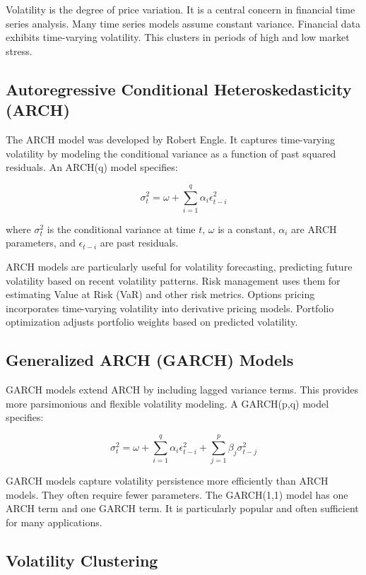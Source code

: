 Volatility is the degree of price variation. It is a central concern in financial time series analysis. Many time series models assume constant variance. Financial data exhibits time-varying volatility. This clusters in periods of high and low market stress.

\subsection{Autoregressive Conditional Heteroskedasticity (ARCH)}

The ARCH model was developed by Robert Engle. It captures time-varying volatility by modeling the conditional variance as a function of past squared residuals. An ARCH(q) model specifies:

\[
\sigma_t^2 = \omega + \sum_{i=1}^{q} \alpha_i \epsilon_{t-i}^2
\]

where \(\sigma_t^2\) is the conditional variance at time \(t\), \(\omega\) is a constant, \(\alpha_i\) are ARCH parameters, and \(\epsilon_{t-i}\) are past residuals.

ARCH models are particularly useful for volatility forecasting, predicting future volatility based on recent volatility patterns. Risk management uses them for estimating Value at Risk (VaR) and other risk metrics. Options pricing incorporates time-varying volatility into derivative pricing models. Portfolio optimization adjusts portfolio weights based on predicted volatility.

\subsection{Generalized ARCH (GARCH) Models}

GARCH models extend ARCH by including lagged variance terms. This provides more parsimonious and flexible volatility modeling. A GARCH(p,q) model specifies:

\[
\sigma_t^2 = \omega + \sum_{i=1}^{q} \alpha_i \epsilon_{t-i}^2 + \sum_{j=1}^{p} \beta_j \sigma_{t-j}^2
\]

GARCH models capture volatility persistence more efficiently than ARCH models. They often require fewer parameters. The GARCH(1,1) model has one ARCH term and one GARCH term. It is particularly popular and often sufficient for many applications.

\subsection{Volatility Clustering}

